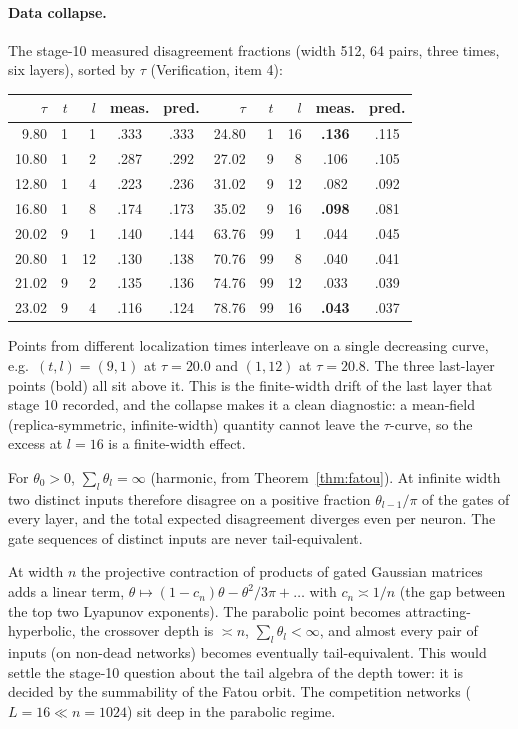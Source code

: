 \paragraph{Data collapse.} The stage-10 measured disagreement fractions (width 512, 64 pairs, three times, six layers), sorted by
$\tau$ (Verification, item 4):
\begin{center}\small
\begin{tabular}{rrrcc|rrrcc}\toprule
$\tau$ & $t$ & $l$ & meas. & pred. & $\tau$ & $t$ & $l$ & meas. & pred.\\\midrule
9.80&1&1&.333&.333 & 24.80&1&16&\textbf{.136}&.115\\
10.80&1&2&.287&.292 & 27.02&9&8&.106&.105\\
12.80&1&4&.223&.236 & 31.02&9&12&.082&.092\\
16.80&1&8&.174&.173 & 35.02&9&16&\textbf{.098}&.081\\
20.02&9&1&.140&.144 & 63.76&99&1&.044&.045\\
20.80&1&12&.130&.138 & 70.76&99&8&.040&.041\\
21.02&9&2&.135&.136 & 74.76&99&12&.033&.039\\
23.02&9&4&.116&.124 & 78.76&99&16&\textbf{.043}&.037\\\bottomrule
\end{tabular}
\end{center}
Points from different localization times interleave on a single decreasing curve, e.g.\ $(t,l)=(9,1)$ at $\tau=20.0$ and $(1,12)$ at $\tau=20.8$.
The three last-layer points (bold) all sit above it. This is the finite-width drift of the last layer that stage 10 recorded, and the
collapse makes it a clean diagnostic: a mean-field (replica-symmetric, infinite-width) quantity cannot leave the $\tau$-curve, so the
excess at $l=16$ is a finite-width effect.

\begin{proposition}\label{prop:tail}
For $\theta_0>0$, $\sum_l\theta_l=\infty$ (harmonic, from Theorem~\ref{thm:fatou}). At infinite width two distinct inputs therefore disagree on a
positive fraction $\theta_{l-1}/\pi$ of the gates of every layer, and the total expected disagreement diverges even per neuron. The
gate sequences of distinct inputs are never tail-equivalent.
\end{proposition}
\begin{conjecture}\label{conj:hyper}
At width $n$ the projective contraction of products of gated Gaussian matrices adds a linear term,
$\theta\mapsto(1-c_n)\theta-\theta^2/3\pi+\dots$ with $c_n\asymp1/n$ (the gap between the top two Lyapunov exponents). The parabolic point becomes
attracting-hyperbolic, the crossover depth is $\asymp n$, $\sum_l\theta_l<\infty$, and almost every pair of inputs (on non-dead
networks) becomes eventually tail-equivalent. This would settle the stage-10 question about the tail algebra of the depth tower: it is
decided by the summability of the Fatou orbit. The competition networks ($L=16\ll n=1024$) sit deep in the parabolic regime.
\end{conjecture}
